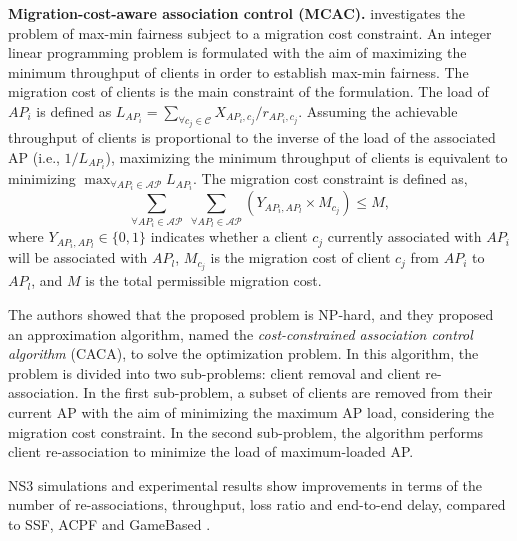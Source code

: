 
\textbf{Migration-cost-aware association control  (MCAC).} 
\label{Migration-DAM}
\cite{Migration-DAM} investigates the problem of max-min fairness subject to a migration cost constraint.
An integer linear programming problem is formulated with the aim of maximizing the minimum throughput of clients in order to establish max-min fairness.
The migration cost of clients is the main constraint of the formulation.
The load of $AP_{i}$ is defined as $L_{AP_{i}}=\sum_{\forall c_{j} \in \mathcal{C}} X_{AP_{i},c_{j}}/r_{AP_{i},c_{j}}$.
Assuming the achievable throughput of clients is proportional to the inverse of the load of the associated AP (i.e., $1/L_{AP_{i}}$), maximizing the minimum throughput of clients is equivalent to minimizing $\max_{\forall AP_{i} \in \mathcal{AP}}L_{AP_{i}}$. 
The migration cost constraint is defined as, 
\begin{equation}
\sum_{\forall AP_{i} \in \mathcal{AP}}\;\sum_{\forall AP_{l} \in \mathcal{AP}} (Y_{AP_{i},AP_{l}}\times M_{c_j}) \le M,
\end{equation}
where $Y_{AP_{i},AP_{l}}\in\{0,1\}$ indicates whether a client $c_{j}$ currently associated with $AP_{i}$ will be associated with $AP_{l}$, $M_{c_{j}}$ is the migration cost of client $c_{j}$ from $AP_{i}$ to $AP_{l}$, and $M$ is the total permissible migration cost.

The authors showed that the proposed problem is NP-hard, and they proposed an approximation algorithm, named the \textit{cost-constrained association control algorithm} (CACA), to solve the optimization problem. 
In this algorithm, the problem is divided into two sub-problems: client removal and client re-association. 
In the first sub-problem, a subset of clients are removed from their current AP with the aim of minimizing the maximum AP load, considering the migration cost constraint. 
In the second sub-problem, the algorithm performs client re-association to minimize the load of maximum-loaded AP.

NS3 \cite{NS3}  simulations and experimental results show improvements in terms of the number of re-associations, throughput, loss ratio and end-to-end delay, compared to SSF, ACPF and GameBased \cite{GameBased}. 




